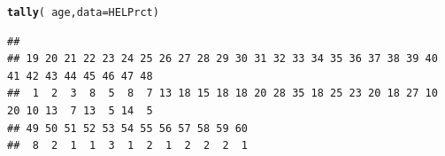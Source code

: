 \documentclass[twoside]{book}\usepackage[]{graphicx}\usepackage[]{xcolor}
\makeatletter
\newcommand{\hlopt}[1]{\textcolor[rgb]{0,0,0}{#1}}%
\newcommand{\hlstd}[1]{\textcolor[rgb]{0.345,0.345,0.345}{#1}}%
\newcommand{\hlkwc}[1]{\textcolor[rgb]{0.333,0.667,0.333}{#1}}%
\newcommand{\hlkwd}[1]{\textcolor[rgb]{0.737,0.353,0.396}{\textbf{#1}}}%
\newenvironment{kframe}{%
 \def\at@end@of@kframe{}%
 \ifinner\ifhmode%
  \def\at@end@of@kframe{\end{minipage}}%
  \begin{minipage}{\columnwidth}%
 \fi\fi%
 \def\FrameCommand##1{\hskip\@totalleftmargin \hskip-\fboxsep
 \colorbox{shadecolor}{##1}\hskip-\fboxsep
     \hskip-\linewidth \hskip-\@totalleftmargin \hskip\columnwidth}%
 \MakeFramed {\advance\hsize-\width
   \@totalleftmargin\z@ \linewidth\hsize
   \@setminipage}}%
 {\par\unskip\endMakeFramed%
 \at@end@of@kframe}
\newenvironment{knitrout}{}{} %
\makeatother
\begin{document}
\begin{knitrout}
\color{fgcolor}\begin{kframe}
\begin{alltt}
\hlkwd{tally}\hlstd{(}\hlopt{~}\hlstd{age,} \hlkwc{data} \hlstd{= HELPrct)}
\end{alltt}
\begin{verbatim}
## 
## 19 20 21 22 23 24 25 26 27 28 29 30 31 32 33 34 35 36 37 38 39 40 41 42 43 44 45 46 47 48 
##  1  2  3  8  5  8  7 13 18 15 18 18 20 28 35 18 25 23 20 18 27 10 20 10 13  7 13  5 14  5 
## 49 50 51 52 53 54 55 56 57 58 59 60 
##  8  2  1  1  3  1  2  1  2  2  2  1
\end{verbatim}
\end{kframe}
\end{knitrout}
\end{document}
